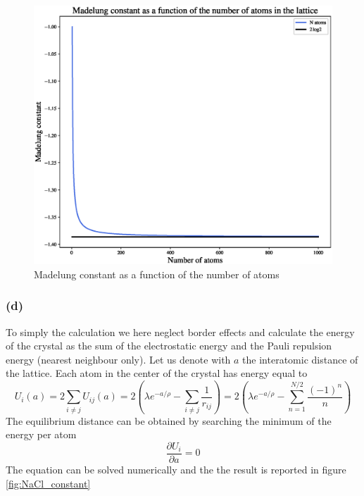 \begin{figure}[h]
    \centering 
    \includegraphics[scale=0.7]{figures/madelung.eps}
    \caption{Madelung constant as a function of the number of atoms}
    \label{fig:Madelung_constant_Natoms}
\end{figure}

\subsubsection*{(d)}
To simply the calculation we here neglect border effects and calculate the energy of the crystal as the sum of the electrostatic energy and the Pauli repulsion energy (nearest neighbour only). Let us denote with $a$ the interatomic distance of the lattice. Each atom in the center of the crystal has energy equal to
\begin{equation*}
    U_i(a) = 2 \sum_{i \neq j}U_{ij}(a) = 2\left(\lambda e^{-a/\rho} - \sum_{i \neq j}\frac{1}{r_{ij}}\right) = 
    2\left(\lambda e^{-a/\rho} - \sum_{n=1}^{N/2}\frac{(-1)^{n}}{n}\right)
\end{equation*}
The equilibrium distance can be obtained by searching the minimum of the energy per atom
\begin{equation*}
    \frac{\partial U_i}{\partial a} = 0
\end{equation*}
The equation can be solved numerically and the the result is reported in figure \ref{fig:NaCl_constant}

